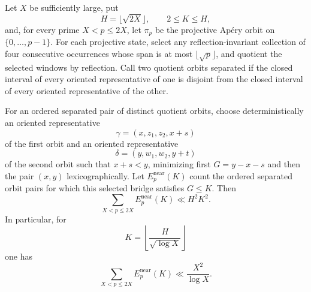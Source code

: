 \begin{proposition}
\label{prop:near-bridge-energy}
Let \(X\) be sufficiently large, put
\[
 H=\lfloor\sqrt{2X}\rfloor,\qquad 2\le K\le H,
\]
and, for every prime \(X<p\le2X\), let \(\pi_p\) be the projective
Ap\'ery orbit on \(\{0,\ldots,p-1\}\).  For each projective state, select
any reflection-invariant collection of four consecutive occurrences whose
span is at most \(\lfloor\sqrt p\rfloor\), and quotient the selected windows
by reflection.  Call two quotient orbits separated if the closed interval
of every oriented representative of one is disjoint from the closed interval
of every oriented representative of the other.

For an ordered separated pair of distinct quotient orbits, choose
deterministically an oriented representative
\[
 \gamma=(x,z_1,z_2,x+s)
\]
of the first orbit and an oriented representative
\[
 \delta=(y,w_1,w_2,y+t)
\]
of the second orbit such that \(x+s<y\), minimizing first
\(G=y-x-s\) and then the pair \((x,y)\) lexicographically.  Let
\(E_p^{\mathrm{near}}(K)\) count the ordered separated orbit pairs for
which this selected bridge satisfies \(G\le K\).  Then
\[
 \sum_{X<p\le2X}E_p^{\mathrm{near}}(K)\ll H^2K^2.
\]
In particular, for
\[
 K=\left\lfloor\frac{H}{\sqrt{\log X}}\right\rfloor
\]
one has
\[
 \sum_{X<p\le2X}E_p^{\mathrm{near}}(K)
 \ll\frac{X^2}{\log X}.
\]
\end{proposition}

